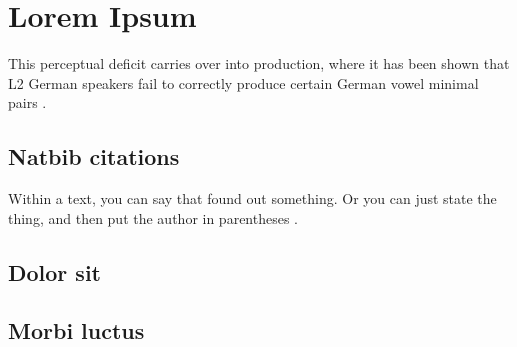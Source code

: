 \section{Lorem Ipsum}

  This perceptual deficit carries over into production, where it has been shown that L2 German speakers fail to correctly produce certain German vowel minimal pairs \citep{hirschfeld1994untersuchungen, Zimmerer}.  

\subsection{Natbib citations}
Within a text, you can say that \citet{lin2001} found out something. Or you can just state the thing, and then put the author in parentheses \citep[see][]{szpektor2004}.

\subsection{Dolor sit}
\lipsum[4-6]

\subsection{Morbi luctus}
\lipsum[7-10]
